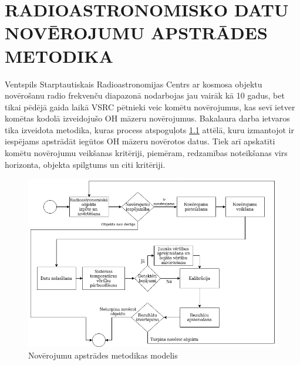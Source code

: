 \chapter{RADIOASTRONOMISKO DATU NOVĒROJUMU APSTRĀDES METODIKA}

Ventspils Starptautiskais Radioastronomijas Centrs ar kosmosa objektu novērošanu radio frekvenču diapazonā nodarbojas jau vairāk kā 10 gadus, bet tikai pēdējā gaida laikā VSRC pētnieki veic komētu novērojumus, kas sevī ietver komētas kodolā izveidojušo OH māzeru novērojumus. Bakalaura darba ietvaros tika izveidota metodika, kuras process atspoguļots \ref{fig:workflow} attēlā, kuru izmantojot ir iespējams apstrādāt iegūtos OH māzeru novērotos datus. Tiek arī apskatīti komētu novērojumu veikšanas kritēriji, piemēram, redzamības noteikšanas virs horizonta, objekta spilgtums un citi kritēriji.


\begin{figure}[H]
\centering
\includegraphics[width=\textwidth]{images/created/workflow-model.png}
\caption{Novērojumu apstrādes metodikas modelis}
\label{fig:workflow}
\end{figure}

%    


